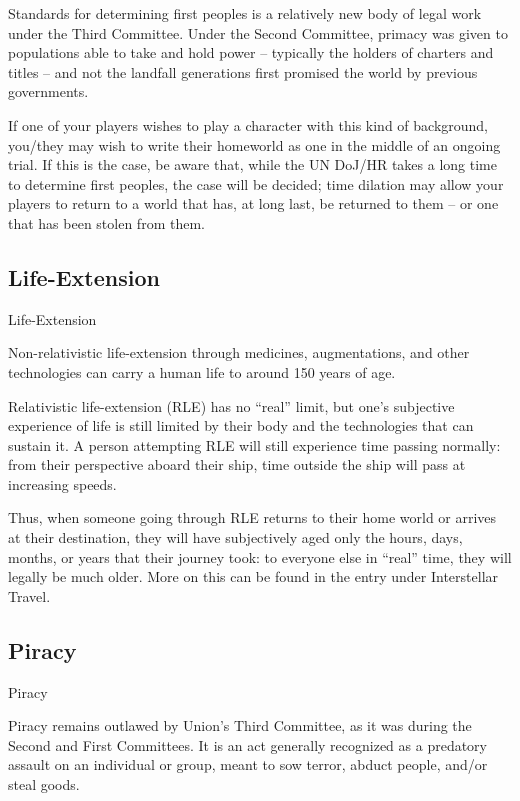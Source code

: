 Standards for determining first peoples is a relatively new body of legal work under the Third
Committee. Under the Second Committee, primacy was given to populations able to take and
hold power -- typically the holders of charters and titles -- and not the landfall generations first
promised the world by previous governments.

If one of your players wishes to play a character with this kind of background, you/they may wish
to write their homeworld as one in the middle of an ongoing trial. If this is the case, be aware
that, while the UN DoJ/HR takes a long time to determine first peoples, the case will be decided;
time dilation may allow your players to return to a world that has, at long last, be returned to
them -- or one that has been stolen from them.

\subsection{Life-Extension}
Life-Extension

Non-relativistic life-extension through medicines, augmentations, and other technologies can
carry a human life to around 150 years of age.


Relativistic life-extension (RLE) has no “real” limit, but one’s subjective experience of life is still
limited by their body and the technologies that can sustain it. A person attempting RLE will still
experience time passing normally: from their perspective aboard their ship, time outside the ship
will pass at increasing speeds.





Thus, when someone going through RLE returns to their home world or arrives at their
destination, they will have subjectively aged only the hours, days, months, or years that their
journey took: to everyone else in “real” time, they will legally be much older. More on this can be
found in the entry under Interstellar Travel.

\subsection{Piracy}
Piracy

Piracy remains outlawed by Union’s Third Committee, as it was during the Second and First
Committees. It is an act generally recognized as a predatory assault on an individual or group,
meant to sow terror, abduct people, and/or steal goods.


